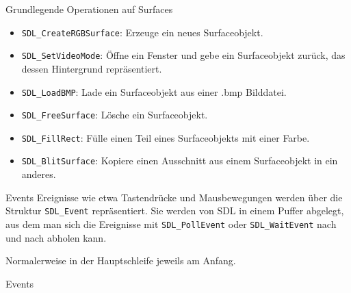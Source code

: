 \begin{frame}[fragile]{Grundlegende Operationen auf Surfaces}
	\begin{itemize}
		\item \verb|SDL_CreateRGBSurface|: Erzeuge ein neues Surfaceobjekt.
		\item \verb|SDL_SetVideoMode|: Öffne ein Fenster und gebe ein Surfaceobjekt zurück, das dessen Hintergrund repräsentiert.
		\item \verb|SDL_LoadBMP|: Lade ein Surfaceobjekt aus einer .bmp Bilddatei.
		\item \verb|SDL_FreeSurface|: Lösche ein Surfaceobjekt.
		\item \verb|SDL_FillRect|: Fülle einen Teil eines Surfaceobjekts mit einer Farbe.
		\item \verb|SDL_BlitSurface|: Kopiere einen Ausschnitt aus einem Surfaceobjekt in ein anderes.
	\end{itemize}
\end{frame}

\begin{frame}[fragile]{Events}
	Ereignisse wie etwa Tastendrücke und Mausbewegungen werden über die Struktur \verb|SDL_Event| repräsentiert.
	Sie werden von SDL in einem Puffer abgelegt, aus dem man sich die Ereignisse mit \verb|SDL_PollEvent| oder 
	\verb|SDL_WaitEvent| nach und nach abholen kann.
	
	Normalerweise in der Hauptschleife jeweils am Anfang.
\end{frame}

\begin{frame}[fragile]{Events}
	
\end{frame}